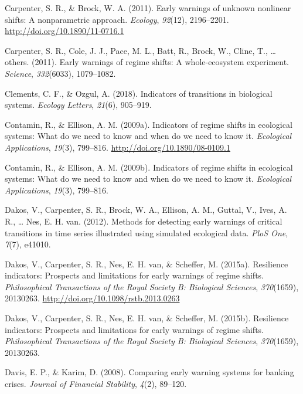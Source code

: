 \documentclass[12pt,twoside,openany]{reedthesis}
\begin{document}
\hypertarget{ref-carpenter_early_2011}{}
Carpenter, S. R., \& Brock, W. A. (2011). Early warnings of unknown
nonlinear shifts: A nonparametric approach. \emph{Ecology},
\emph{92}(12), 2196--2201. \url{http://doi.org/10.1890/11-0716.1}

\hypertarget{ref-carpenter2011early}{}
Carpenter, S. R., Cole, J. J., Pace, M. L., Batt, R., Brock, W., Cline,
T., \ldots{} others. (2011). Early warnings of regime shifts: A
whole-ecosystem experiment. \emph{Science}, \emph{332}(6033),
1079--1082.

\hypertarget{ref-clements2018indicators}{}
Clements, C. F., \& Ozgul, A. (2018). Indicators of transitions in
biological systems. \emph{Ecology Letters}, \emph{21}(6), 905--919.

\hypertarget{ref-contamin_indicators_2009}{}
Contamin, R., \& Ellison, A. M. (2009a). Indicators of regime shifts in
ecological systems: What do we need to know and when do we need to know
it. \emph{Ecological Applications}, \emph{19}(3), 799--816.
\url{http://doi.org/10.1890/08-0109.1}

\hypertarget{ref-contamin2009indicators}{}
Contamin, R., \& Ellison, A. M. (2009b). Indicators of regime shifts in
ecological systems: What do we need to know and when do we need to know
it. \emph{Ecological Applications}, \emph{19}(3), 799--816.

\hypertarget{ref-dakos_methods_2012}{}
Dakos, V., Carpenter, S. R., Brock, W. A., Ellison, A. M., Guttal, V.,
Ives, A. R., \ldots{} Nes, E. H. van. (2012). Methods for detecting
early warnings of critical transitions in time series illustrated using
simulated ecological data. \emph{PloS One}, \emph{7}(7), e41010.

\hypertarget{ref-dakos_resilience_2015}{}
Dakos, V., Carpenter, S. R., Nes, E. H. van, \& Scheffer, M. (2015a).
Resilience indicators: Prospects and limitations for early warnings of
regime shifts. \emph{Philosophical Transactions of the Royal Society B:
Biological Sciences}, \emph{370}(1659), 20130263.
\url{http://doi.org/10.1098/rstb.2013.0263}

\hypertarget{ref-dakos2015resilience}{}
Dakos, V., Carpenter, S. R., Nes, E. H. van, \& Scheffer, M. (2015b).
Resilience indicators: Prospects and limitations for early warnings of
regime shifts. \emph{Philosophical Transactions of the Royal Society B:
Biological Sciences}, \emph{370}(1659), 20130263.

\hypertarget{ref-davis_comparing_2008}{}
Davis, E. P., \& Karim, D. (2008). Comparing early warning systems for
banking crises. \emph{Journal of Financial Stability}, \emph{4}(2),
89--120.
\end{document}
